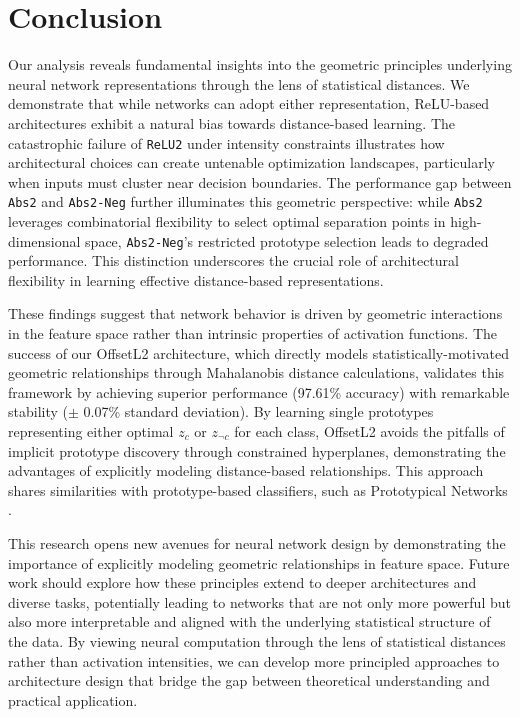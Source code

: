 \section{Conclusion}
\label{sec:conclusion}

Our analysis reveals fundamental insights into the geometric principles underlying neural network representations through the lens of statistical distances. We demonstrate that while networks can adopt either representation, ReLU-based architectures exhibit a natural bias towards distance-based learning. The catastrophic failure of \texttt{ReLU2} under intensity constraints illustrates how architectural choices can create untenable optimization landscapes, particularly when inputs must cluster near decision boundaries. The performance gap between \texttt{Abs2} and \texttt{Abs2-Neg} further illuminates this geometric perspective: while \texttt{Abs2} leverages combinatorial flexibility to select optimal separation points in high-dimensional space, \texttt{Abs2-Neg}'s restricted prototype selection leads to degraded performance. This distinction underscores the crucial role of architectural flexibility in learning effective distance-based representations.

These findings suggest that network behavior is driven by geometric interactions in the feature space rather than intrinsic properties of activation functions. The success of our OffsetL2 architecture, which directly models statistically-motivated geometric relationships through Mahalanobis distance calculations, validates this framework by achieving superior performance (97.61\% accuracy) with remarkable stability ($\pm$ 0.07\% standard deviation). By learning single prototypes representing either optimal $z_c$ or $z_{\neg c}$ for each class, OffsetL2 avoids the pitfalls of implicit prototype discovery through constrained hyperplanes, demonstrating the advantages of explicitly modeling distance-based relationships. This approach shares similarities with prototype-based classifiers, such as Prototypical Networks \cite{snell2017prototypical}.

This research opens new avenues for neural network design by demonstrating the importance of explicitly modeling geometric relationships in feature space. Future work should explore how these principles extend to deeper architectures and diverse tasks, potentially leading to networks that are not only more powerful but also more interpretable and aligned with the underlying statistical structure of the data. By viewing neural computation through the lens of statistical distances rather than activation intensities, we can develop more principled approaches to architecture design that bridge the gap between theoretical understanding and practical application.